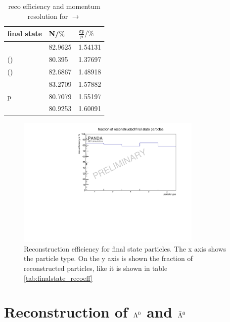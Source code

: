 	\begin{table}
		\centering
		\caption{reco efficiency and momentum resolution for \pbarpSystem $\rightarrow$ \excitedanticascade \cascade}
		\label{tab:finalstate_recoeff_cc}
		\begin{tabular}{lll}
			\hline
			final state & N/$\%$ & $\frac{\sigma p}{p}/\%$ \\
			\hline
			\hline
			\piplus &  82.9625&   1.54131\\
			\piminusone(\cascade) & 80.395&   1.37697  \\
			\piminustwo(\lam) &  82.6867&   1.48918\\
			\kplus& 83.2709&   1.57882 \\
			p &  80.7079&   1.55197\\
			\antiproton &  80.9253&   1.60091\\\hline
			 
		\end{tabular}
	\end{table}
	
	\begin{figure}
	
		\centering
		\includegraphics[width=0.8\textwidth]{./plots/finalstate/reco_efficiency.pdf}
		\caption{Reconstruction efficiency for final state particles. The x axis shows the particle type. 
				On the y axis is shown the fraction of reconstructed particles, like it is shown in table \ref{tab:finalstate_recoeff}}
		\label{fig:finalstate_recoeff}
	
	\end{figure}
	

	
\section{Reconstruction of $\boldmath{\Lambda}^0$ and $\boldmath{\bar{\Lambda}^0}$}
